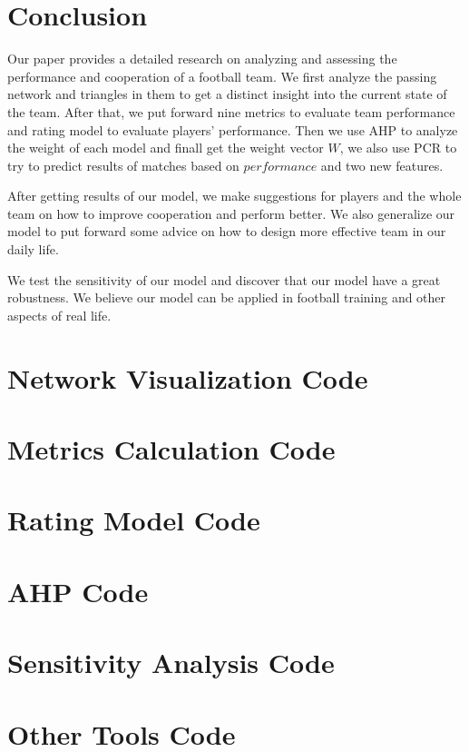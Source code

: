 \documentclass[12pt]{mcmthesis}
\begin{document}
\section{Conclusion}
	Our paper provides a detailed research on analyzing and assessing the performance and cooperation of a football team. We first analyze the passing network and triangles in them to get a distinct insight into the current state of the team. After that, we put forward nine metrics to evaluate team performance and rating model to evaluate players' performance. Then we use AHP to analyze the weight of each model and finall get the weight vector $W$, we also use PCR to try to predict results of matches based on $performance$ and two new features.
	
	After getting results of our model, we make suggestions for players and the whole team on how to improve cooperation and perform better. We also generalize our model to put forward some advice on how to design more effective team in our daily life.
	
	We test the sensitivity of our model and discover that our model have a great robustness. We believe our model can be applied in football training and other aspects of real life.



\newpage
\begin{appendices}
	\section{Network Visualization Code}
	
	\section{Metrics Calculation Code}
	
	\section{Rating Model Code}
	
	\section{AHP Code}
	
	\section{Sensitivity Analysis Code}
	
	\section{Other Tools Code}
	
\end{appendices}
\end{document}
